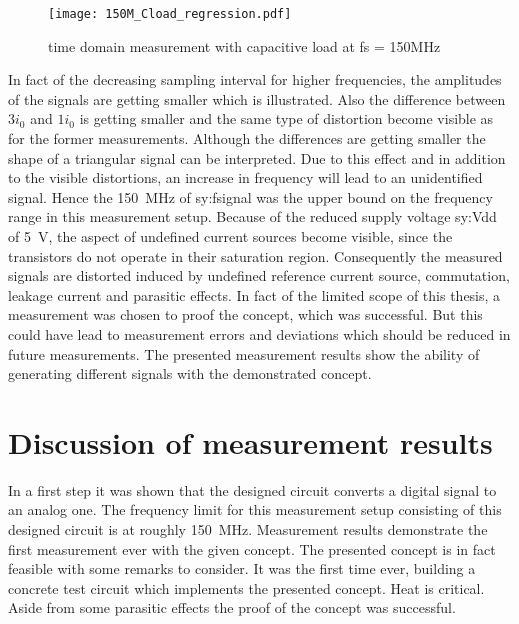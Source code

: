\begin{figure}[htb!]
	\centering
  \texttt{[image: 150M\_Cload\_regression.pdf]}
	\caption{time domain measurement with capacitive load at fs = 150MHz}
	\label{fig:measCload150M}
\end{figure}

In fact of the decreasing sampling interval for higher frequencies, the amplitudes of the signals are getting smaller which is illustrated.
Also the difference between $3 i_0$ and $1 i_0$ is getting smaller and the same type of distortion become visible as for the former measurements.
Although the differences are getting smaller the shape of a triangular signal can be interpreted.
Due to this effect and in addition to the visible distortions, an increase in frequency will lead to an unidentified signal.
Hence the \SI{150}{\mega \hertz} of \gls{sy:fsignal} was the upper bound on the frequency range in this measurement setup.
Because of the reduced supply voltage \gls{sy:Vdd} of \SI{5}{\volt}, the aspect of undefined current sources become visible, since the transistors do not operate in their saturation region.
Consequently the measured signals are distorted induced by undefined reference current source, commutation, leakage current and parasitic effects.
In fact of the limited scope of this thesis, a measurement was chosen to proof the concept, which was successful.
But this could have lead to measurement errors and deviations which should be reduced in future measurements.
The presented measurement results show the ability of generating different signals with the demonstrated concept.

\section{Discussion of measurement results}
In a first step it was shown that the designed circuit converts a digital signal to an analog one.
The frequency limit for this measurement setup consisting of this designed circuit is at roughly \SI{150}{\mega \hertz}.
Measurement results demonstrate the first measurement ever with the given concept.
The presented concept is in fact feasible with some remarks to consider.
It was the first time ever, building a concrete test circuit which implements the presented concept.
Heat is critical. 
Aside from some parasitic effects the proof of the concept was successful.


